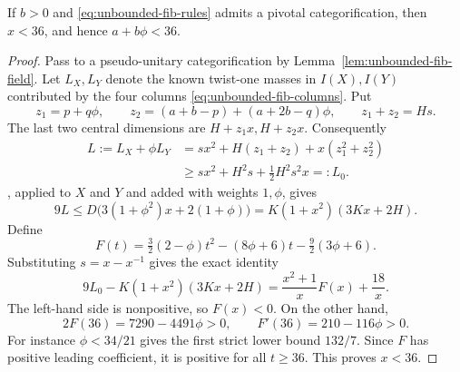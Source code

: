 \begin{lemma}\label{lem:unbounded-fib-bound}
If $b>0$ and \eqref{eq:unbounded-fib-rules} admits a pivotal
categorification, then $x<36$, and hence $a+b\phi<36$.
\end{lemma}
\begin{proof}
Pass to a pseudo-unitary categorification by
Lemma~\ref{lem:unbounded-fib-field}. Let $L_X,L_Y$ denote the known
twist-one masses in $I(X),I(Y)$ contributed by the four columns
\eqref{eq:unbounded-fib-columns}. Put
\[
 z_1=p+q\phi,\qquad
 z_2=(a+b-p)+(a+2b-q)\phi,
 \qquad z_1+z_2=Hs.
\]
The last two central dimensions are $H+z_1x,H+z_2x$.
Consequently
\begin{align*}
 L:=L_X+\phi L_Y
 &=sx^2+H(z_1+z_2)+x(z_1^2+z_2^2)\\
 &\geq sx^2+H^2s+\tfrac12H^2s^2x=:L_0.
\end{align*}
\cite[Proposition~\ref{B-prop:optimized-moment}, with the weaker two-moment bound]{Finite}, applied to $X$ and $Y$ and added
with weights $1,\phi$, gives
\[
 9L\leq D\bigl(3(1+\phi^2)x+2(1+\phi)\bigr)
       =K(1+x^2)(3Kx+2H).
\]
Define
\[
 F(t)=\tfrac32(2-\phi)t^2-(8\phi+6)t
                  -\tfrac92(3\phi+6).
\]
Substituting $s=x-x^{-1}$ gives the exact identity
\[
 9L_0-K(1+x^2)(3Kx+2H)
       =\frac{x^2+1}{x}F(x)+\frac{18}{x}.
\]
The left-hand side is nonpositive, so $F(x)<0$.
On the other hand,
\[
 2F(36)=7290-4491\phi>0,\qquad
 F'(36)=210-116\phi>0.
\]
For instance $\phi<34/21$ gives the first strict lower bound $132/7$.
Since $F$ has positive leading coefficient, it is positive for all
$t\geq36$. This proves $x<36$.
\end{proof}

